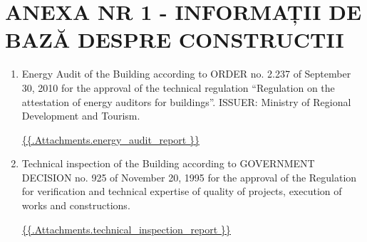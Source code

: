 \section{ANEXA NR 1 - INFORMAȚII DE BAZĂ DESPRE CONSTRUCTII}

\begin{enumerate}

	\item Energy Audit of the Building according to ORDER no. 2.237 of September 30, 2010
for the approval of the technical regulation “Regulation on the attestation of energy auditors for buildings”.
ISSUER: Ministry of Regional Development and Tourism.


\url{ {{.Attachments.energy_audit_report }} }

\iffalse attachment value="energy audit report" \fi


	\item Technical inspection of the Building according to GOVERNMENT DECISION no. 925 of November 20, 1995 for the approval of the Regulation for verification and technical expertise of quality of projects, execution of works and constructions.

\url{ {{.Attachments.technical_inspection_report }} }

\iffalse attachment value="technical inspection report" \fi

\end{enumerate}
